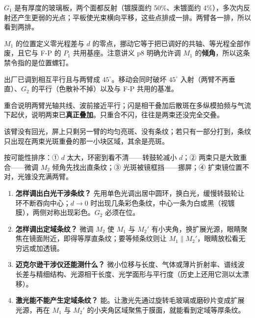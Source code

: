 \documentclass[11pt]{ctexart}
\begin{document}

\(G_1\) 是有厚度的玻璃板，两个面都反射（镀膜面约 50\%、未镀面约 4\%），多次内反射还产生更弱的光点；平板使光束横向平移，这些点排成一排。两臂各一排，所以看到两排。


\(M_1\) 的位置定义零光程差与 \(d\) 的零点，挪动它等于把已调好的共轴、等光程全部作废，且它与 F-P 的 \(P_1\) 共用基座。注意讲义 p8 明确允许调 \(M_1\) 的\textbf{倾角}，所以这条禁令指的是位置螺钉。


出厂已调到相互平行且与两臂成 \(45^\circ\)。移动会同时破坏 \(45^\circ\) 入射（两臂不再垂直）、\(G_2\) 的平行（色散补不掉）以及与 F-P 共用的基准。


重合说明两臂光轴共线、波前接近平行；闪是相干叠加后散斑在多纵模拍频与气流下起伏，说明两束已\textbf{真正叠加}。只重合不闪，往往是两束还没完全交叠。


该臂没有回光，屏上只剩另一臂的均匀亮斑、没有条纹；若只有一部分打到，条纹只出现在两束光斑重叠的那一小块区域，其余是亮斑。


按可能性排序：① \(d\) 太大，环密到看不清——转鼓轮减小 \(d\)；② 两束只是大致重合——微调 \(M_2\) 倾角先找出直条纹；③ 光斑被镜框挡——挪屏；④ 扩束镜位置不对，光锥没充满两臂。


\begin{enumerate}
\item \textbf{怎样调出白光干涉条纹？} 先用单色光调出居中圆环，换白光，缓慢转鼓轮让环不断吞向中心；\(d\to0\) 时出现几条彩色条纹，中心一条为白或黑（视镀膜），两侧对称出现彩色。\(G_2\) 必须在位。
\item \textbf{怎样调出定域条纹？} 微调 \(M_2\) 使 \(M_1\) 与 \(M_2'\) 有小夹角，换扩展光源，眼睛聚焦在镜面附近，即得等厚直条纹；要等倾条纹则让 \(M_1\parallel M_2'\)，眼睛放松看无穷远或加透镜。
\item \textbf{迈克尔逊干涉仪还能测什么？} 微小位移与长度、气体或薄片折射率、谱线波长差与精细结构、光源相干长度、光学面形与平行度（历史上还用它测以太漂移）。
\item \textbf{激光能不能产生定域条纹？} 能。让激光先通过旋转毛玻璃或磨砂片变成扩展光源，再在 \(M_1\) 与 \(M_2'\) 的小夹角区域聚焦于膜面，就能看到定域等厚条纹。
\end{enumerate}
\end{document}
